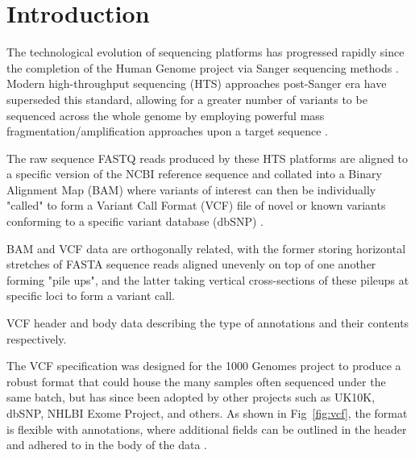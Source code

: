 
\section{Introduction}


The technological evolution of sequencing platforms has progressed rapidly since the completion of the Human Genome project via Sanger sequencing methods \citep{lander2001initial,sanger1977dna}. Modern high-throughput sequencing (HTS) approaches post-Sanger era have superseded this standard, allowing for a greater number of variants to be sequenced across the whole genome by employing powerful mass fragmentation/amplification approaches upon a target sequence \citep{lengauer2007bioinformatics,pabinger2014survey}.

The raw sequence FASTQ reads produced by these HTS platforms are aligned to a specific version of the NCBI reference sequence and collated into a Binary Alignment Map (BAM) where variants of interest can then be individually "called" to form a Variant Call Format (VCF) file of novel or known variants conforming to a specific variant database (dbSNP) \citep{li2009sequence,danecek2011variant}.

BAM and VCF data are orthogonally related, with the former storing horizontal stretches of FASTA sequence reads aligned unevenly on top of one another forming "pile ups", and the latter taking vertical cross-sections of these pileups at specific loci to form a variant call.



{VCF header and body data describing the type of annotations and their contents respectively.}


The VCF specification was designed for the 1000 Genomes project to produce a robust format that could house the many samples often sequenced under the same batch, but has since been adopted by other projects such as UK10K, dbSNP, NHLBI Exome Project, and others. As shown in Fig~\ref{fig:vcf}, the format is flexible with annotations, where additional fields can be outlined in the header and adhered to in the body of the data \citep{danecek2011variant}. 

